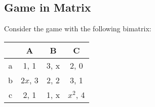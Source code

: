 \documentclass[11pt, answers]{exam}
\begin{document}
%
%
\begin{questions}
\section{Game in Matrix}
\question
Consider the game with the following bimatrix:
\begin{table}[htbp]
  \centering
    \begin{tabular}{|c|c|c|c|}
    \hline
          & A     & B     & C \\
    \hline
    a     & 1, 1  & 3, x  & 2, 0 \\
    \hline
    b     & $2x$, 3 & 2, 2  & 3, 1 \\
    \hline
    c     & 2, 1  & 1, x  & $x^2$, 4 \\
    \hline
    \end{tabular}
\end{table}
\end{questions}
\end{document}
